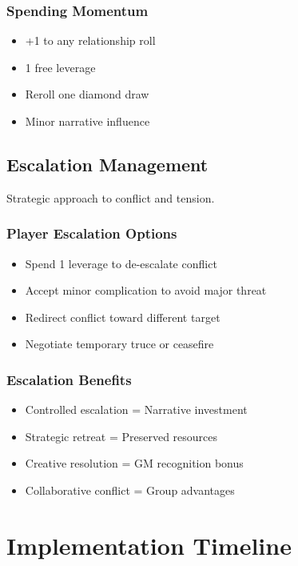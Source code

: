 \subsubsection{Spending Momentum}

\begin{itemize}
\item +1 to any relationship roll
\item 1 free leverage
\item Reroll one diamond draw
\item Minor narrative influence
\end{itemize}

\subsection{Escalation Management}

Strategic approach to conflict and tension.

\subsubsection{Player Escalation Options}

\begin{itemize}
\item Spend 1 leverage to de-escalate conflict
\item Accept minor complication to avoid major threat
\item Redirect conflict toward different target
\item Negotiate temporary truce or ceasefire
\end{itemize}

\subsubsection{Escalation Benefits}

\begin{itemize}
\item Controlled escalation = Narrative investment
\item Strategic retreat = Preserved resources
\item Creative resolution = GM recognition bonus
\item Collaborative conflict = Group advantages
\end{itemize}

\section{Implementation Timeline}

